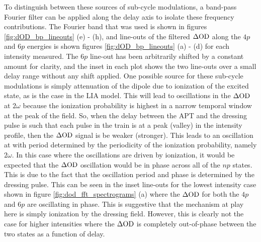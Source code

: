 To distinguish between these sources of sub-cycle modulations, a band-pass Fourier filter can be applied along the delay axis to isolate these frequency contributions.  The Fourier band that was used is shown in figures \ref{fig:dOD_bp_lineouts} (e) - (h), and line-outs of the filtered $\Delta\mathrm{OD}$ along the $4p$ and $6p$ energies is shown figures \ref{fig:dOD_bp_lineouts} (a) - (d) for each intensity measured.  The $6p$ line-out has been arbitrarily shifted by a constant amount for clarity, and the inset in each plot shows the two line-outs over a small delay range without any shift applied. One possible source for these sub-cycle modulations is simply attenuation of the dipole due to ionization of the excited state, as is the case in the LIA model. This will lead to oscillations in the $\Delta\mathrm{OD}$ at $2\omega$ because the ionization probability is highest in a narrow temporal window at the peak of the field. So, when the delay between the APT and the dressing pulse is such that each pulse in the train is at a peak (valley) in the intensity profile, then the $\Delta\mathrm{OD}$ signal is be weaker (stronger).  This leads to an oscillation at with period determined by the periodicity of the ionization probability, namely $2\omega$.  In this case where the oscillations are driven by ionization, it would be expected that the $\Delta\mathrm{OD}$ oscillation would be in phase across all of the $np$ states.  This is due to the fact that the oscillation period and phase is determined by the dressing pulse.  This can be seen in the inset line-outs for the lowest intensity case shown in figure \ref{fig:dod_fft_spectrograms} (a) where the $\Delta\mathrm{OD}$ for both the $4p$ and $6p$ are oscillating in phase. This is suggestive that the mechanism at play here is simply ionization by the dressing field. However, this is clearly not the case for higher intensities where the $\Delta\mathrm{OD}$ is completely out-of-phase between the two states as a function of delay.

